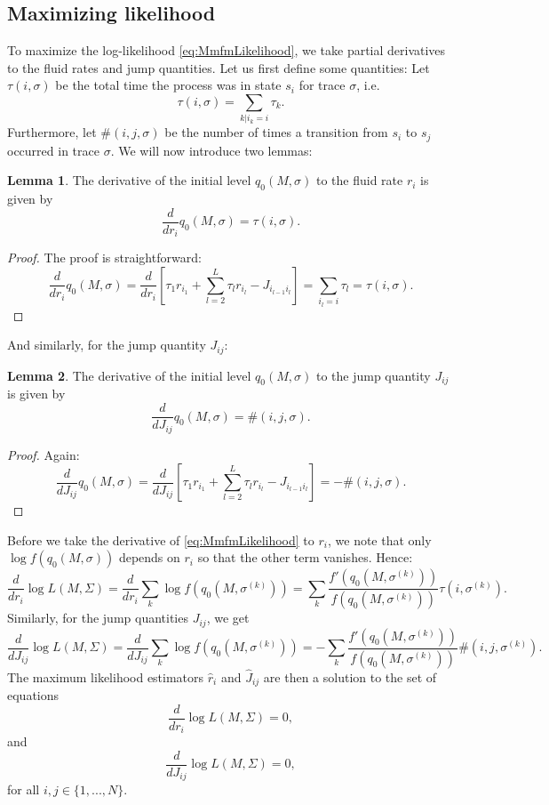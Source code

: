\documentclass[a4paper]{thesis}
\theoremstyle{definition}
\newtheorem{lemma}{Lemma}
\begin{document}
\subsection{Maximizing likelihood}
To maximize the log-likelihood \eqref{eq:MmfmLikelihood}, we take partial derivatives to the fluid rates and jump quantities.
Let us first define some quantities:
Let $\tau(i,\sigma)$ be the total time the process was in state $s_i$ for trace $\sigma$, i.e.
$$
\tau(i,\sigma)=\sum\limits_{k|i_k=i}\tau_k.
$$
Furthermore, let $\#(i,j,\sigma)$ be the number of times a transition from $s_i$ to $s_j$ occurred in trace $\sigma$.
We will now introduce two lemmas:
\begin{lemma}
	The derivative of the initial level $q_0(M,\sigma)$ to the fluid rate $r_i$ is given by
	\[
	\frac{d}{dr_i}q_0(M,\sigma)=\tau(i,\sigma).
	\]
	\begin{proof}
		The proof is straightforward:
		\[
		\frac{d}{dr_i}q_0(M,\sigma)=\frac{d}{dr_i}\left[\tau_1r_{i_1}+\sum\limits_{l=2}^{L}\tau_lr_{i_l}-J_{i_{l-1}i_l}\right]=\sum\limits_{i_l=i}\tau_l=\tau(i,\sigma).
		\]
	\end{proof}
\end{lemma}
And similarly, for the jump quantity $J_{ij}$:
\begin{lemma}
	The derivative of the initial level  $q_0(M,\sigma)$ to the jump quantity $J_{ij}$ is given by
	\[
	\frac{d}{dJ_{ij}}q_0(M,\sigma)=\#(i,j,\sigma).
	\]
	\begin{proof}
		Again:
		\[
		\frac{d}{dJ_{ij}}q_0(M,\sigma)=\frac{d}{dJ_{ij}}\left[\tau_1r_{i_1}+\sum\limits_{l=2}^{L}\tau_lr_{i_l}-J_{i_{l-1}i_l}\right]=-\#(i,j,\sigma).
		\]
	\end{proof}
\end{lemma}

Before we take the derivative of \eqref{eq:MmfmLikelihood} to $r_i$, we note that only $\log f(q_0(M,\sigma))$ depends on $r_i$ so that the other term vanishes.
Hence:
\[
\frac{d}{dr_i}\log L(M,\Sigma)
=\frac{d}{dr_i}\sum_k\log f(q_0(M,\sigma^{(k)}))=\sum_k\frac{f'(q_0(M,\sigma^{(k)}))}{f(q_0(M,\sigma^{(k)}))}\tau(i,\sigma^{(k)}).
\]
Similarly, for the jump quantities $J_{ij}$, we get
$$
\frac{d}{dJ_{ij}}\log L(M,\Sigma)=\frac{d}{dJ_{ij}}\sum_k\log f(q_0(M,\sigma^{(k)}))=-\sum_k\frac{f'(q_0(M,\sigma^{(k)}))}{f(q_0(M,\sigma^{(k)}))}\#(i,j,\sigma^{(k)}).
$$
The maximum likelihood estimators $\hat r_i$ and $\hat J_{ij}$ are then a solution to the set of equations 
\[
\frac{d}{dr_i}\log L(M,\Sigma)=0,
\]
and
\[
\frac{d}{dJ_{ij}}\log L(M,\Sigma)=0,
\]
for all $i,j\in\{1,...,N\}$.
\end{document}
